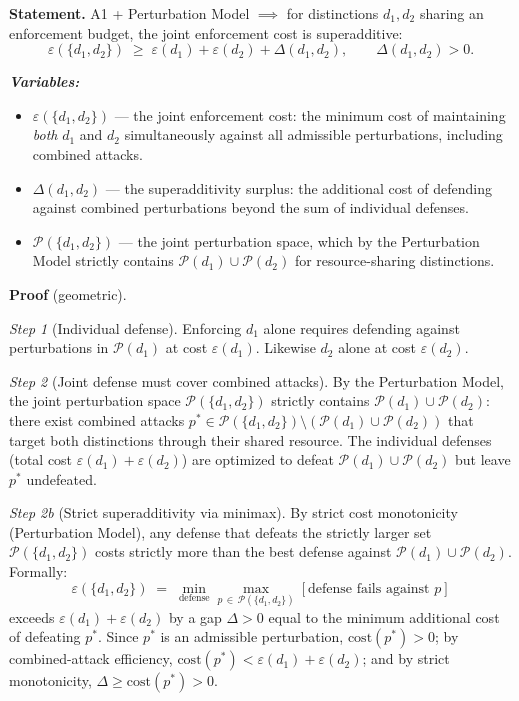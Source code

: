 \documentclass[11pt]{article}
\newenvironment{varlist}{\begin{itemize}[nosep,leftmargin=2em]}{\end{itemize}}
\begin{document}
\begin{tcolorbox}[apfbox, title={$L_{\Delta}$ (Competition): Superadditivity from Shared Budgets}]
\textbf{Statement.}  A1 + Perturbation Model $\implies$ for distinctions $d_1, d_2$ sharing an enforcement budget, the joint enforcement cost is superadditive:
\begin{equation}
\varepsilon(\{d_1, d_2\}) \;\ge\; \varepsilon(d_1) + \varepsilon(d_2) + \Delta(d_1, d_2), \qquad \Delta(d_1, d_2) > 0.
\end{equation}

\smallskip\noindent\textbf{\textit{Variables:}}
\begin{varlist}
\item $\varepsilon(\{d_1, d_2\})$ --- the joint enforcement cost: the minimum cost of maintaining \emph{both} $d_1$ and $d_2$ simultaneously against all admissible perturbations, including combined attacks.
\item $\Delta(d_1, d_2)$ --- the superadditivity surplus: the additional cost of defending against combined perturbations beyond the sum of individual defenses.
\item $\mathcal{P}(\{d_1, d_2\})$ --- the joint perturbation space, which by the Perturbation Model strictly contains $\mathcal{P}(d_1) \cup \mathcal{P}(d_2)$ for resource-sharing distinctions.
\end{varlist}

\smallskip\noindent\textbf{Proof} (geometric).

\textit{Step 1} (Individual defense).  Enforcing $d_1$ alone requires defending against perturbations in $\mathcal{P}(d_1)$ at cost $\varepsilon(d_1)$.  Likewise $d_2$ alone at cost $\varepsilon(d_2)$.

\textit{Step 2} (Joint defense must cover combined attacks).  By the Perturbation Model, the joint perturbation space $\mathcal{P}(\{d_1, d_2\})$ strictly contains $\mathcal{P}(d_1) \cup \mathcal{P}(d_2)$: there exist combined attacks $p^* \in \mathcal{P}(\{d_1, d_2\}) \setminus (\mathcal{P}(d_1) \cup \mathcal{P}(d_2))$ that target both distinctions through their shared resource.  The individual defenses (total cost $\varepsilon(d_1) + \varepsilon(d_2)$) are optimized to defeat $\mathcal{P}(d_1) \cup \mathcal{P}(d_2)$ but leave $p^*$ undefeated.

\textit{Step 2b} (Strict superadditivity via minimax).  By strict cost monotonicity (Perturbation Model), any defense that defeats the strictly larger set $\mathcal{P}(\{d_1,d_2\})$ costs strictly more than the best defense against $\mathcal{P}(d_1) \cup \mathcal{P}(d_2)$.  Formally:
\begin{equation}
\varepsilon(\{d_1,d_2\}) \;=\; \min_{\text{defense}} \max_{p \,\in\, \mathcal{P}(\{d_1,d_2\})} [\text{defense fails against } p]
\end{equation}
exceeds $\varepsilon(d_1) + \varepsilon(d_2)$ by a gap $\Delta > 0$ equal to the minimum additional cost of defeating $p^*$.  Since $p^*$ is an admissible perturbation, $\mathrm{cost}(p^*) > 0$; by combined-attack efficiency, $\mathrm{cost}(p^*) < \varepsilon(d_1) + \varepsilon(d_2)$; and by strict monotonicity, $\Delta \ge \mathrm{cost}(p^*) > 0$.


\end{tcolorbox}
\end{document}
